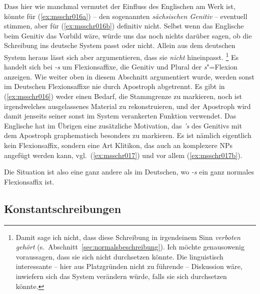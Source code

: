 Dass hier wie manchmal vermutet der Einfluss des Englischen am Werk ist, könnte für (\ref{ex:msschr016a}) -- den sogenannten \textit{sächsischen Genitiv} -- eventuell stimmen, aber für (\ref{ex:msschr016b}) definitiv nicht.
Selbst wenn das Englische beim Genitiv das Vorbild wäre, würde uns das noch nichts darüber sagen, ob die Schreibung ins deutsche System passt oder nicht.
Allein aus dem deutschen System heraus lässt sich aber argumentieren, dass sie \textit{nicht} hineinpasst.%
\footnote{Damit sage ich nicht, dass diese Schreibung in irgendeinem Sinn \textit{verboten gehört} (s.\ Abschnitt~\ref{sec:normalsbeschreibung}).
Ich möchte genausowenig voraussagen, dass sie sich nicht durchsetzen könnte.
Die linguistisch interessante -- hier aus Platzgründen nicht zu führende -- Diskussion wäre, inwiefern sich das System verändern würde, falls sie sich durchsetzen könnte.}
Es handelt sich bei \textit{-s} um Flexionsaffixe, die Genitiv und Plural der \textit{s}"=Flexion anzeigen.
Wie weiter oben in diesem Abschnitt argumentiert wurde, werden sonst im Deutschen Flexionsaffixe nie durch Apostroph abgetrennt.
Es gibt in (\ref{ex:msschr016}) weder einen Bedarf, die Stammgrenze zu markieren, noch ist irgendwelches ausgelassenes Material zu rekonstruieren, und der Apostroph wird damit jenseits seiner sonst im System verankerten Funktion verwendet.
Das Englische hat im Übrigen eine zusätzliche Motivation, das \textit{'s} des Genitivs mit dem Apostroph graphematisch besonders zu markieren.
Es ist nämlich eigentlich kein Flexionsaffix, sondern eine Art Klitikon, das auch an komplexere NPs angefügt werden kann, vgl.\ (\ref{ex:msschr017}) und vor allem (\ref{ex:msschr017b}).

\Np

\begin{exe}
  \ex\label{ex:msschr017} 
  \begin{xlist}
  \end{xlist}
\end{exe}

Die Situation ist also eine ganz andere als im Deutschen, wo \textit{-s} ein ganz normales Flexionsaffix ist.

\subsection{Konstantschreibungen}

\label{sec:konstanz}

